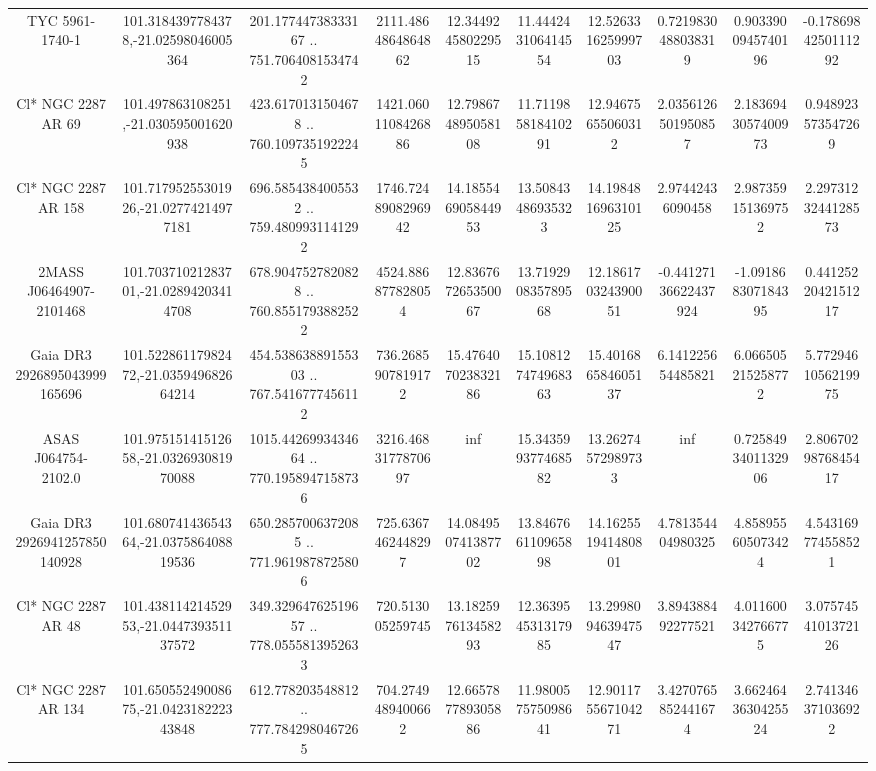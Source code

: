 \begin{table}
\begin{tabular}{cccccccccc}
TYC 5961-1740-1 & 101.3184397784378,-21.02598046005364 & 201.17744738333167 .. 751.7064081534742 & 2111.4864864864862 & 12.344924580229515 & 11.444243106414554 & 12.526331625999703 & 0.7219830488038319 & 0.9033900945740196 & -0.1786984250111292 \\
Cl* NGC 2287     AR      69 & 101.497863108251,-21.030595001620938 & 423.6170131504678 .. 760.1097351922245 & 1421.0601108426886 & 12.798674895058108 & 11.711985818410291 & 12.94675655060312 & 2.0356126501950857 & 2.1836943057400973 & 0.948923573547269 \\
Cl* NGC 2287     AR     158 & 101.71795255301926,-21.02774214977181 & 696.5854384005532 .. 759.4809931141292 & 1746.7248908296942 & 14.185546905844953 & 13.50843486935323 & 14.198481696310125 & 2.97442436090458 & 2.987359151369752 & 2.2973123244128573 \\
2MASS J06464907-2101468 & 101.70371021283701,-21.02894203414708 & 678.9047527820828 .. 760.8551793882522 & 4524.886877828054 & 12.836767265350067 & 13.719290835789568 & 12.186170324390051 & -0.44127136622437924 & -1.091868307184395 & 0.4412522042151217 \\
Gaia DR3 2926895043999165696 & 101.52286117982472,-21.035949682664214 & 454.53863889155303 .. 767.5416777456112 & 736.2685907819172 & 15.476407023832186 & 15.108127474968363 & 15.401686584605137 & 6.141225654485821 & 6.066505215258772 & 5.7729461056219975 \\
ASAS J064754-2102.0 & 101.97515141512658,-21.032693081970088 & 1015.4426993434664 .. 770.1958947158736 & 3216.4683177870697 & inf & 15.343599377468582 & 13.26274572989733 & inf & 0.7258493401132906 & 2.8067029876845417 \\
Gaia DR3 2926941257850140928 & 101.68074143654364,-21.037586408819536 & 650.2857006372085 .. 771.9619878725806 & 725.6367462448297 & 14.084950741387702 & 13.846766110965898 & 14.162551941480801 & 4.781354404980325 & 4.858955605073424 & 4.543169774558521 \\
Cl* NGC 2287     AR      48 & 101.43811421452953,-21.044739351137572 & 349.32964762519657 .. 778.0555813952633 & 720.513005259745 & 13.182597613458293 & 12.363954531317985 & 13.299809463947547 & 3.894388492277521 & 4.011600342766775 & 3.0757454101372126 \\
Cl* NGC 2287     AR     134 & 101.65055249008675,-21.042318222343848 & 612.778203548812 .. 777.7842980467265 & 704.2749489400662 & 12.665787789305886 & 11.980057575098641 & 12.901175567104271 & 3.4270765852441674 & 3.6624643630425524 & 2.741346371036922 \\

\end{tabular}
\end{table}
